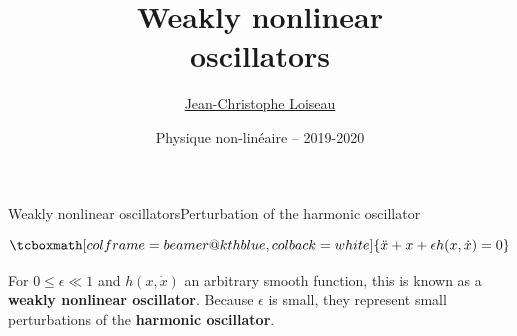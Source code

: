 \documentclass[usenames,dvipsnames,svgnames,10pt,aspectratio=169]{beamer}
\title[Nonlinear physics] %
{
	Weakly nonlinear \\
  oscillators
}
\author[J.-Ch.~Loiseau] %
{
	\underline{Jean-Christophe Loiseau}
}
\institute[unused]
{
	\url{jean-christophe.loiseau@ensam.eu} \\
	Laboratoire DynFluid \\
	Arts et M\'etiers, France.
}
\date[unused]{Physique non-lin\'eaire -- 2019-2020}
\begin{document}
\titleframe	%


\begin{frame}[t, c]{Weakly nonlinear oscillators}{Perturbation of the harmonic oscillator}

  \[
  \tcboxmath[colframe=beamer@kthblue, colback=white]{ \ddot{x} + x + \epsilon h(x, \dot{x}) = 0 }
  \]
  
  \bigskip
  
  For $0 \leq \epsilon \ll 1$ and $h(x, \dot{x})$ an arbitrary smooth function, this is known as a \alert{\textbf{weakly nonlinear oscillator}}.
  Because $\epsilon$ is small, they represent small perturbations of the \alert{\textbf{harmonic oscillator}}.

\end{frame}
\end{document}
